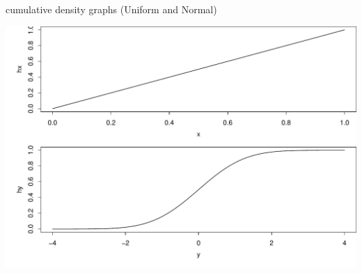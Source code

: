 \documentclass{beamer}\usepackage[]{graphicx}\usepackage[]{color}
\newenvironment{knitrout}{}{} %
\renewenvironment{knitrout}{\begin{spacing}{0.75}\begin{tiny}}{\end{tiny}\end{spacing}}
\begin{document}
\begin{frame}{cumulative density graphs (Uniform and Normal)}

\begin{knitrout}\small
{}\color{fgcolor}

{\centering \includegraphics[width=0.99\linewidth]{figure/graphics-unnamed-chunk-4-1} 

}



\end{knitrout}

\end{frame}
\end{document}

